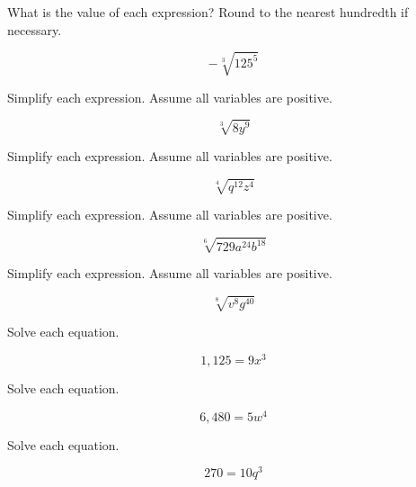 \documentclass{article}
\newenvironment{practice}[2]{}{}        %
\newcommand{\answer}[1]{}               %
\begin{document}
\begin{practice}{34}{1}
What is the value of each expression? Round to the nearest hundredth if necessary.

\[
-\sqrt[3]{125^5}
\]

\answer{\(-3,125\)}
\end{practice}

\begin{practice}{35}{1}
Simplify each expression. Assume all variables are positive.

\[
\sqrt[3]{8y^9}
\]

\answer{\(2y^3\)}
\end{practice}

\begin{practice}{36}{1}
Simplify each expression. Assume all variables are positive.

\[
\sqrt[4]{q^{12}z^4}
\]

\answer{\(q^3z\)}
\end{practice}

\begin{practice}{37}{1}
Simplify each expression. Assume all variables are positive.

\[
\sqrt[6]{729a^{24}b^{18}}
\]

\answer{\(3a^4b^3\)}
\end{practice}

\begin{practice}{38}{1}
Simplify each expression. Assume all variables are positive.

\[
\sqrt[8]{v^8g^{40}}
\]

\answer{\(vg^5\)}
\end{practice}

\begin{practice}{39}{1}
Solve each equation.

\[
1,125=9x^3
\]

\answer{5}
\end{practice}

\begin{practice}{40}{1}
Solve each equation.

\[
6,480=5w^4
\]

\answer{\(\pm6\)}
\end{practice}

\begin{practice}{41}{1}
Solve each equation.

\[
270=10q^3
\]

\answer{3}
\end{practice}
\end{document}
